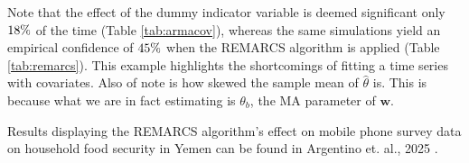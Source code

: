 

Note that the effect of the dummy indicator variable is deemed significant only
 $18\%$ of the time (Table \ref{tab:armacov}), whereas the same simulations yield an empirical confidence of $45\%$ when the REMARCS algorithm is applied (Table \ref{tab:remarcs}). This example highlights the shortcomings of fitting a time series with covariates.
  Also of note is how skewed the sample mean of $\hat{\theta}$ is. This is because what we are in fact estimating is 
  $\theta_b$, the MA parameter of $\mathbf{w}$.













Results displaying the REMARCS algorithm's effect on mobile phone survey data on household food security in Yemen can be found in Argentino et. al., 2025
 \cite{Argentino2026review}. 


